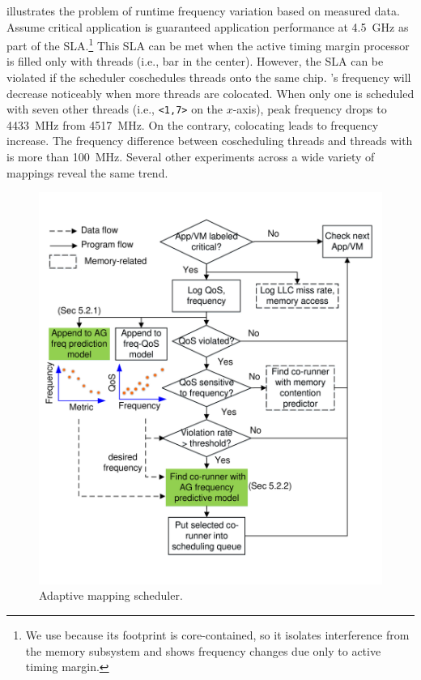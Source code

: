  illustrates the problem of runtime frequency variation based on measured data. Assume critical application  is guaranteed application performance at 4.5~GHz as part of the SLA.\footnote{We use  because its footprint is core-contained, so it isolates interference from the memory subsystem and shows frequency changes due only to active timing margin.} This SLA can be met when the active timing margin processor is filled only with  threads (i.e., bar in the center). However, the SLA can be violated if the scheduler coschedules  threads onto the same chip. 's frequency will decrease noticeably when more  threads are colocated. When only one  is scheduled with seven other  threads (i.e., \texttt{<1,7>} on the $x$-axis), peak frequency drops to 4433~MHz from 4517~MHz. On the contrary, colocating  leads to frequency increase. The frequency difference between coscheduling  threads and  threads with  is more than 100~MHz. Several other experiments across a wide variety of mappings reveal the same trend.


\begin{figure}[!b]
\centering
  \vspace{-0.4cm}
   \includegraphics[trim=0 0 0 0,clip,width=.7\linewidth]{graphs/adaptive_mapping_scheduler.pdf}
   \caption{Adaptive mapping scheduler.}
  \label{fig:adaptive-mapping-scheduler}
\end{figure}

